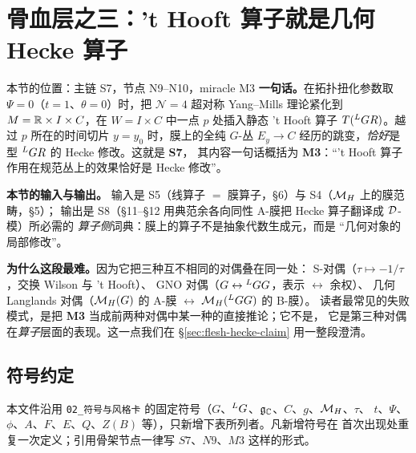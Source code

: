 
\section{骨血层之三：\texorpdfstring{'t Hooft}{'t Hooft} 算子就是几何 Hecke 算子}
\label{sec:flesh-hecke}

\begin{kcard}{本节的位置：主链 S7，节点 N9--N10，miracle M3}
\textbf{一句话。}在拓扑扭化参数取 $\Psi=0$（$t=1$、$\theta=0$）时，把 $\mathcal{N}=4$ 超对称
Yang--Mills 理论紧化到 $M=\mathbb{R}\times I\times C$，在 $W=I\times C$ 中一点 $p$ 处插入静态
't Hooft{} 算子 $T({}^{L}G R)$。越过 $p$ 所在的时间切片 $y=y_0$ 时，膜上的全纯 $G$-丛
$E_y\to C$ 经历的跳变，\emph{恰好}是型 ${}^{L}G R$ 的 Hecke 修改。这就是 \textbf{S7}，
其内容一句话概括为 \textbf{M3}：“'t Hooft{} 算子作用在规范丛上的效果恰好是
Hecke 修改”。\pA{}

\textbf{本节的输入与输出。}
输入是 S5（线算子 $=$ 膜算子，§6）与 S4（$\mathcal{M}_H$ 上的膜范畴，§5）；
输出是 S8（§11--§12 用典范余各向同性 A-膜把 Hecke 算子翻译成 $\mathcal{D}$-模）所必需的
\emph{算子侧}词典：膜上的算子不是抽象代数生成元，而是 “几何对象的局部修改”。\pB{}

\textbf{为什么这段最难。}因为它把三种互不相同的对偶叠在同一处：
S-对偶（$\tau\mapsto-1/\tau$，交换 Wilson 与 't Hooft）、
GNO 对偶（$G\leftrightarrow{}^{L}G G$，表示 $\leftrightarrow$ 余权）、
几何 Langlands 对偶（$\mathcal{M}_H(G)$ 的 A-膜 $\leftrightarrow$ $\mathcal{M}_H({}^{L}G G)$ 的 B-膜）。
读者最常见的失败模式，是把 \textbf{M3} 当成前两种对偶中某一种的直接推论；它不是，
它是第三种对偶在\emph{算子}层面的表现。这一点我们在 §\ref{sec:flesh-hecke-claim} 用一整段澄清。
\end{kcard}

\subsection*{符号约定}

本文件沿用 \texttt{02\_符号与风格卡} 的固定符号（$G$、${}^{L}G$、$\mathfrak{g}_{\mathbb{C}}$、$C$、$g$、$\mathcal{M}_H$、$\tau$、
$t$、$\Psi$、$\phi$、$A$、$F$、$E$、$Q$、$Z(B)$ 等），只新增下表所列者。凡新增符号在
首次出现处重复一次定义；引用骨架节点一律写 $S7$、$N9$、$M3$ 这样的形式。

